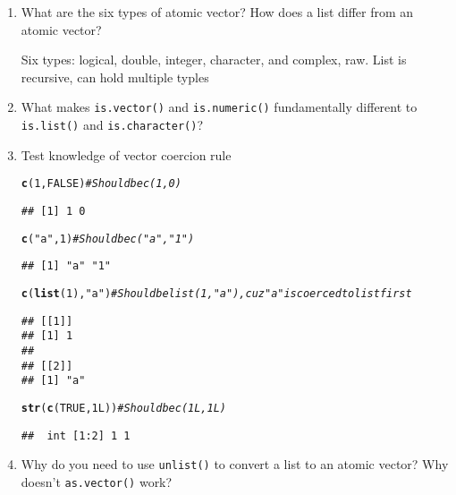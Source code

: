 \documentclass{article}\usepackage[]{graphicx}\usepackage[]{color}
\makeatletter
\newcommand{\hlnum}[1]{\textcolor[rgb]{0.686,0.059,0.569}{#1}}%
\newcommand{\hlstr}[1]{\textcolor[rgb]{0.192,0.494,0.8}{#1}}%
\newcommand{\hlcom}[1]{\textcolor[rgb]{0.678,0.584,0.686}{\textit{#1}}}%
\newcommand{\hlstd}[1]{\textcolor[rgb]{0.345,0.345,0.345}{#1}}%
\newcommand{\hlkwd}[1]{\textcolor[rgb]{0.737,0.353,0.396}{\textbf{#1}}}%
\newenvironment{kframe}{%
 \def\at@end@of@kframe{}%
 \ifinner\ifhmode%
  \def\at@end@of@kframe{\end{minipage}}%
  \begin{minipage}{\columnwidth}%
 \fi\fi%
 \def\FrameCommand##1{\hskip\@totalleftmargin \hskip-\fboxsep
 \colorbox{shadecolor}{##1}\hskip-\fboxsep
     \hskip-\linewidth \hskip-\@totalleftmargin \hskip\columnwidth}%
 \MakeFramed {\advance\hsize-\width
   \@totalleftmargin\z@ \linewidth\hsize
   \@setminipage}}%
 {\par\unskip\endMakeFramed%
 \at@end@of@kframe}
\newenvironment{knitrout}{}{} %
\makeatother
\begin{document}
\begin{enumerate}
\item What are the six types of atomic vector? How does a list differ from an atomic vector?

Six types: logical, double, integer, character, and complex, raw. List is recursive, can hold multiple typles

\item What makes \verb`is.vector()` and \verb`is.numeric()` fundamentally different to \verb`is.list()` and \verb`is.character()`?

\item Test knowledge of vector coercion rule

\begin{knitrout}
\color{fgcolor}\begin{kframe}
\begin{alltt}
\hlkwd{c}\hlstd{(}\hlnum{1}\hlstd{,} \hlnum{FALSE}\hlstd{)} \hlcom{# Should be c(1, 0)}
\end{alltt}
\begin{verbatim}
## [1] 1 0
\end{verbatim}
\begin{alltt}
\hlkwd{c}\hlstd{(}\hlstr{"a"}\hlstd{,} \hlnum{1}\hlstd{)} \hlcom{# Should be c("a", "1")}
\end{alltt}
\begin{verbatim}
## [1] "a" "1"
\end{verbatim}
\begin{alltt}
\hlkwd{c}\hlstd{(}\hlkwd{list}\hlstd{(}\hlnum{1}\hlstd{),} \hlstr{"a"}\hlstd{)} \hlcom{# Should be list(1, "a"), cuz "a" is coerced to list first}
\end{alltt}
\begin{verbatim}
## [[1]]
## [1] 1
## 
## [[2]]
## [1] "a"
\end{verbatim}
\begin{alltt}
\hlkwd{str}\hlstd{(}\hlkwd{c}\hlstd{(}\hlnum{TRUE}\hlstd{,} \hlnum{1L}\hlstd{))} \hlcom{# Should be c(1L, 1L)}
\end{alltt}
\begin{verbatim}
##  int [1:2] 1 1
\end{verbatim}
\end{kframe}
\end{knitrout}

\item Why do you need to use \verb`unlist()` to convert a list to an atomic vector? Why doesn't \verb`as.vector()` work?


\end{enumerate}
\end{document}
